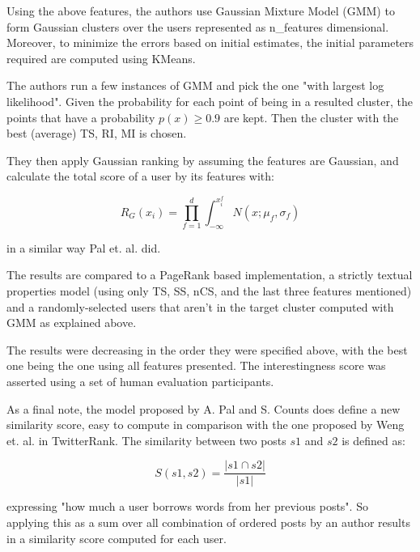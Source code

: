 Using the above features, the authors use Gaussian Mixture Model (GMM) to form Gaussian clusters over the users represented as n\_features dimensional. Moreover, to minimize the errors based on initial estimates, the initial parameters required are computed using KMeans.

The authors run a few instances of GMM and pick the one "with largest log likelihood". Given the probability for each point of being in a resulted cluster, the points that have a probability $p(x) \geq 0.9$ are kept. Then the cluster with the best (average) TS, RI, MI is chosen.

They then apply Gaussian ranking by assuming the features are Gaussian, and calculate the total score of a user by its features with:

$$R_G(x_i) = \prod_{f=1}^{d}\int_{-\infty}^{x_i^f} N(x; \mu_f, \sigma_f)$$

in a similar way Pal et. al.\cite{qapal} did.

The results are compared to a PageRank\cite{pagerank} based implementation, a strictly textual properties model (using only TS, SS, nCS, and the last three features mentioned) and a randomly-selected users that aren't in the target cluster computed with GMM as explained above.

The results were decreasing in the order they were specified above, with the best one being the one using all features presented. The interestingness score was asserted using a set of human evaluation participants.

As a final note, the model proposed by A. Pal and S. Counts\cite{microblogs} does define a new similarity score, easy to compute in comparison with the one proposed by Weng et. al. in TwitterRank\cite{twitterrank}. The similarity between two posts $s1$ and $s2$ is defined as:

$$S(s1, s2) = \frac{|s1 \cap s2|}{|s1|}$$

expressing "how much a user borrows words from her previous posts". So applying this as a sum over all combination of ordered posts by an author results in a similarity score computed for each user.